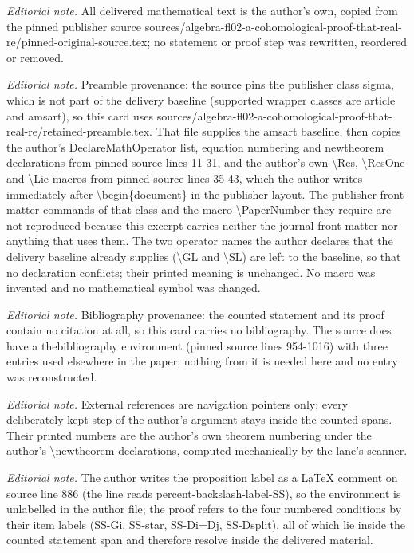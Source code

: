\maketitle
\noindent\textit{Editorial note.} All delivered mathematical text is the author's own, copied from the pinned publisher source sources/algebra-fl02-a-cohomological-proof-that-real-re/pinned-original-source.tex; no statement or proof step was rewritten, reordered or removed.\par\medskip
\noindent\textit{Editorial note.} Preamble provenance: the source pins the publisher class sigma, which is not part of the delivery baseline (supported wrapper classes are article and amsart), so this card uses sources/algebra-fl02-a-cohomological-proof-that-real-re/retained-preamble.tex. That file supplies the amsart baseline, then copies the author's DeclareMathOperator list, equation numbering and newtheorem declarations from pinned source lines 11-31, and the author's own \textbackslash{}Res, \textbackslash{}ResOne and \textbackslash{}Lie macros from pinned source lines 35-43, which the author writes immediately after \textbackslash{}begin\{document\} in the publisher layout. The publisher front-matter commands of that class and the macro \textbackslash{}PaperNumber they require are not reproduced because this excerpt carries neither the journal front matter nor anything that uses them. The two operator names the author declares that the delivery baseline already supplies (\textbackslash{}GL and \textbackslash{}SL) are left to the baseline, so that no declaration conflicts; their printed meaning is unchanged. No macro was invented and no mathematical symbol was changed.\par\medskip
\noindent\textit{Editorial note.} Bibliography provenance: the counted statement and its proof contain no citation at all, so this card carries no bibliography. The source does have a thebibliography environment (pinned source lines 954-1016) with three entries used elsewhere in the paper; nothing from it is needed here and no entry was reconstructed.\par\medskip
\noindent\textit{Editorial note.} External references are navigation pointers only; every deliberately kept step of the author's argument stays inside the counted spans. Their printed numbers are the author's own theorem numbering under the author's \textbackslash{}newtheorem declarations, computed mechanically by the lane's scanner.\par\medskip
\noindent\textit{Editorial note.} The author writes the proposition label as a LaTeX comment on source line 886 (the line reads percent-backslash-label-SS), so the environment is unlabelled in the author file; the proof refers to the four numbered conditions by their item labels (SS-Gi, SS-star, SS-Di=Dj, SS-Dsplit), all of which lie inside the counted statement span and therefore resolve inside the delivered material.\par\medskip
